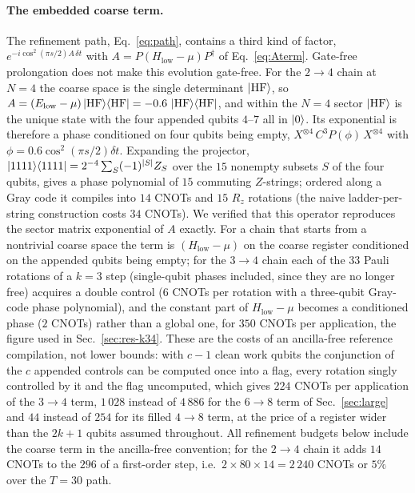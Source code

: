 \documentclass[
  aps,            %
  prc,            %
  reprint,        %
  superscriptaddress,
  floatfix,
  nofootinbib
]{revtex4-2}
\newcommand{\Hlow}{H_{\mathrm{low}}}
\begin{document}
\paragraph{The embedded coarse term.}
The refinement path, Eq.~\eqref{eq:path}, contains a third kind of factor,
$e^{-i\cos^2(\pi s/2)A\,\delta t}$ with $A=P(\Hlow-\mu)P^\dagger$ of
Eq.~\eqref{eq:Aterm}.  Gate-free prolongation does not make this evolution
gate-free.  For the $2\to4$ chain at $N=4$ the coarse space is the single
determinant $\ket{\rm HF}$, so $A=(E_{\rm low}-\mu)\ket{\rm HF}\!\bra{\rm HF}
=-0.6\,\ket{\rm HF}\!\bra{\rm HF}$, and within the $N=4$ sector $\ket{\rm HF}$ is
the unique state with the four appended qubits $4$--$7$ all in $\ket0$.  Its
exponential is therefore a phase conditioned on four qubits being empty,
$X^{\otimes4}\,C^{3}P(\phi)\,X^{\otimes4}$ with $\phi=0.6\cos^2(\pi s/2)\delta t$.
Expanding the projector, $\ket{1111}\!\bra{1111}=2^{-4}\sum_{S}(-1)^{|S|}Z_S$
over the $15$ nonempty subsets $S$ of the four qubits, gives a phase polynomial
of $15$ commuting $Z$-strings; ordered along a Gray code it compiles into
$14$ CNOTs and $15$ $R_z$ rotations (the naive ladder-per-string construction
costs $34$ CNOTs).  We verified that this operator reproduces the sector
matrix exponential of $A$ exactly.  For a chain that starts from a nontrivial
coarse space the term is $(\Hlow-\mu)$ on the coarse register conditioned on
the appended qubits being empty; for the $3\to4$ chain each of the $33$ Pauli
rotations of a $k=3$ step (single-qubit phases included, since they are no
longer free) acquires a double control ($6$ CNOTs per rotation with a
three-qubit Gray-code phase polynomial), and the constant part of $\Hlow-\mu$
becomes a conditioned phase ($2$ CNOTs) rather than a global one, for $350$
CNOTs per application, the figure used in Sec.~\ref{sec:res-k34}.  These
are the costs of an ancilla-free reference compilation, not lower bounds:
with $c-1$ clean work qubits the conjunction of the $c$ appended controls
can be computed once into a flag, every rotation singly controlled by it
and the flag uncomputed, which gives $224$ CNOTs per application of the
$3\to4$ term, $1\,028$ instead of $4\,886$ for the $6\to8$ term of
Sec.~\ref{sec:large} and $44$ instead of $254$ for its filled $4\to8$ term,
at the price of a register wider than the $2k+1$ qubits assumed throughout.
All refinement budgets below include the coarse term in the ancilla-free
convention; for the $2\to4$ chain it adds $14$ CNOTs to the $296$ of a
first-order step, i.e.\ $2\times80\times14=2\,240$ CNOTs or $5\%$ over the
$T=30$ path.
\end{document}
